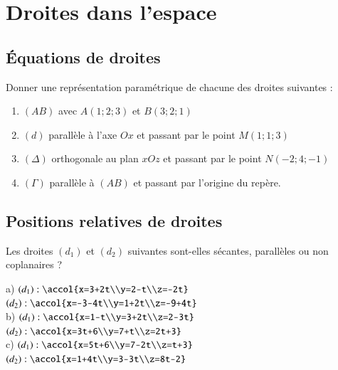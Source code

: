 \documentclass[oneside,12pt]{article}          %
\begin{document}
\section{Droites dans l'espace}

\subsection{Équations de droites}
Donner une représentation paramétrique de chacune des droites suivantes :
\begin{enumerate}
    \item $(AB)$ avec $A(1;2;3)$ et $B(3;2;1)$
    \item $(d)$ parallèle à l'axe $Ox$ et passant par le point $M(1;1;3)$
    \item $(\Delta)$ orthogonale au plan $xOz$ et passant par le point $N(-2;4;-1)$
    \item $(\Gamma)$ parallèle à $(AB)$ et passant par l'origine du repère.
\end{enumerate}



\subsection{Positions relatives de droites}
Les droites $(d_1)$ et $(d_2)$ suivantes sont-elles sécantes, parallèles ou non coplanaires ?

a) $(d_1):\accol{x=3+2t\\y=2-t\\z=-2t}$ \qquad $(d_2):\accol{x=-3-4t\\y=1+2t\\z=-9+4t}$ \\[15pt]
b) $(d_1):\accol{x=1-t\\y=3+2t\\z=2-3t}$ \qquad $(d_2):\accol{x=3t+6\\y=7+t\\z=2t+3}$ \\[15pt]
c) $(d_1):\accol{x=5t+6\\y=7-2t\\z=t+3}$ \qquad $(d_2):\accol{x=1+4t\\y=3-3t\\z=8t-2}$ 
\end{document}
